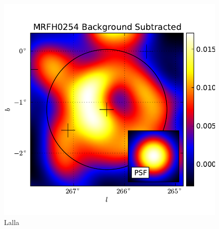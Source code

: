 \documentclass{emulateapj}
\begin{document}
  \begin{figure}
    \begin{center}
      \includegraphics[type=pdf,ext=.pdf,read=.pdf]{source_plots/source_MRFH0254}
    \end{center}
    \caption{Lalla}
  \end{figure}
\end{document}

